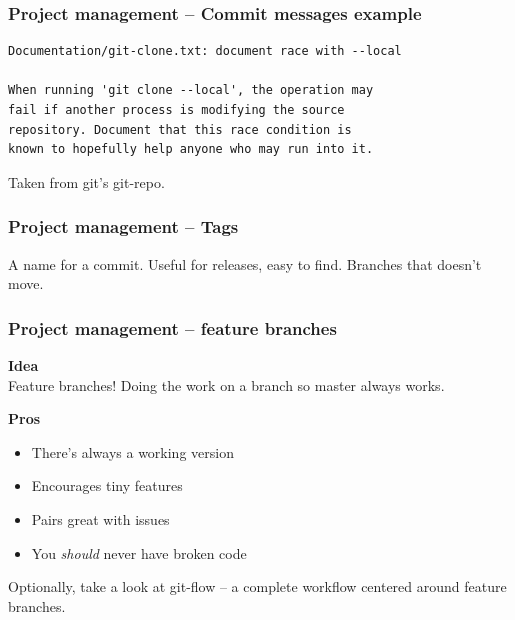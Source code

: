 \documentclass{beamer}
\newcommand{\keyword}[1]{\hspace{-1.0em}\textcolor{lkblue}{\textbf{#1}}\vspace{0.2em}} %
\begin{document}
\begin{frame}[fragile]
  \frametitle{Project management -- Commit messages example}
  \small
  \begin{verbatim}
Documentation/git-clone.txt: document race with --local

When running 'git clone --local', the operation may
fail if another process is modifying the source
repository. Document that this race condition is
known to hopefully help anyone who may run into it.
  \end{verbatim}
  Taken from git's git-repo.
\end{frame}

\begin{frame}[fragile]
  \frametitle{Project management -- Tags}
  
  A name for a commit. Useful for releases, easy to find.
  \vspace{1em}
  Branches that doesn't move.

\end{frame}

\begin{frame}[fragile]
  \frametitle{Project management -- feature branches}

  \keyword{Idea} \\
  Feature branches! Doing the work on a branch so master always works. \\
  \vspace{1em}

  \keyword{Pros}
  \begin{itemize}[<+->]
    \item There's always a working version
    \item Encourages tiny features
    \item Pairs great with issues
    \item You \emph{should} never have broken code
  \end{itemize}
  \vspace{1em}

  Optionally, take a look at git-flow -- a complete workflow centered around
  feature branches.

\end{frame}
\end{document}
